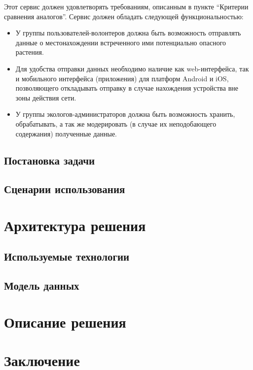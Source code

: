 Этот сервис должен удовлетворять требованиям, описанным в пункте “Критерии сравнения аналогов”.
Сервис должен обладать следующей функциональностью:
\begin{itemize}[topsep=0pt, parsep=0pt, itemsep=0pt, wide=0.5cm]
	\item У группы пользователей-волонтеров должна быть возможность отправлять данные о местонахождении встреченного ими потенциально опасного растения.
	\item Для удобства отправки данных необходимо наличие как web-интерфейса, так и мобильного интерфейса (приложения) для платформ Android и iOS, позволяющего откладывать отправку в случае нахождения устройства вне зоны действия сети.
	\item У группы экологов-администраторов должна быть возможность хранить, обрабатывать, а так же модерировать (в случае их неподобающего содержания) полученные данные.
\end{itemize}

\subsection{Постановка задачи}

\subsection{Сценарии использования}

\section{Архитектура решения}

\subsection{Используемые технологии}

\subsection{Модель данных}

\section{Описание решения}

\section{Заключение}
